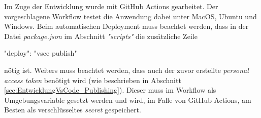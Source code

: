 Im Zuge der Entwicklung wurde mit GitHub Actions gearbeitet.
Der vorgeschlagene Workflow testet die Anwendung dabei unter
MacOS, Ubuntu und Windows. Beim automatischen Deployment muss
beachtet werden, dass in der Datei \emph{package.json} im
Abschnitt \emph{"scripts"} die zusätzliche Zeile
\begin{JsCode}[numbers=none]
"deploy": "vsce publish"
\end{JsCode}
nötig ist. Weiters muss beachtet werden, dass auch der zuvor erstellte 
\emph{personal access token} benötigt wird
(wie beschrieben in Abschnitt \ref{sec:EntwicklungVsCode_Publishing}).
Dieser muss im Workflow als Umgebungsvariable gesetzt werden und
wird, im Falle von GitHub Actions, am Besten als verschlüsseltes
\emph{secret} gespeichert.